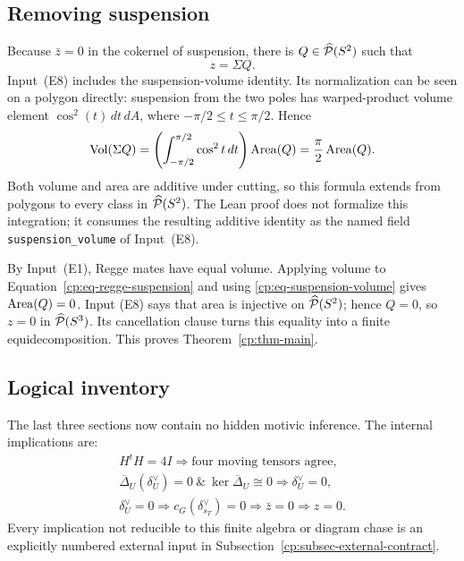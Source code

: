 \subsection{Removing suspension}

Because \(\bar z=0\) in the cokernel of suspension, there is
\(Q\in\widehat{\mathcal P}(S^2)\) such that
\begin{equation}
 z=\Sigma Q.
 \label{cp:eq-regge-suspension}
\end{equation}
Input~\textup{(E8)} includes the suspension-volume identity.  Its
normalization can be seen on a polygon directly: suspension from the two
poles has warped-product volume element
\(\cos^2(t)\,dt\,dA\), where
\(-\pi/2\leq t\leq\pi/2\).  Hence
\begin{equation}
 \operatorname{Vol}(\Sigma Q)
 =\left(\int_{-\pi/2}^{\pi/2}\cos^2t\,dt\right)\operatorname{Area}(Q)
 =\frac\pi2\operatorname{Area}(Q).
 \label{cp:eq-suspension-volume}
\end{equation}
Both volume and area are additive under cutting, so this formula extends
from polygons to every class in \(\widehat{\mathcal P}(S^2)\).  The Lean proof does not
formalize this integration; it consumes the resulting additive identity as
the named field \texttt{suspension\_volume} of Input~\textup{(E8)}.

By Input~\textup{(E1)}, Regge mates have equal volume.  Applying volume to
Equation~\eqref{cp:eq-regge-suspension} and using
\eqref{cp:eq-suspension-volume} gives \(\operatorname{Area}(Q)=0\).  Input
\textup{(E8)} says that area is injective on \(\widehat{\mathcal P}(S^2)\); hence
\(Q=0\), so \(z=0\) in \(\widehat{\mathcal P}(S^3)\).  Its cancellation clause turns
this equality into a finite equidecomposition.  This proves
Theorem~\ref{cp:thm-main}.

\subsection{Logical inventory}

The last three sections now contain no hidden motivic inference.  The
internal implications are:
\[
\begin{gathered}
 H^tH=4I
 \Longrightarrow
 \text{four moving tensors agree},\\
 \overline\Delta_U(\delta_U^\vee)=0
 \ \&\
 \ker\overline\Delta_U\cong0
 \Longrightarrow
 \delta_U^\vee=0,\\
 \delta_U^\vee=0
 \Longrightarrow c_G(\delta_{s_T}^\vee)=0
 \Longrightarrow \bar z=0
 \Longrightarrow z=0.
\end{gathered}
\]
Every implication not reducible to this finite algebra or diagram chase is
an explicitly numbered external input in
Subsection~\ref{cp:subsec-external-contract}.
